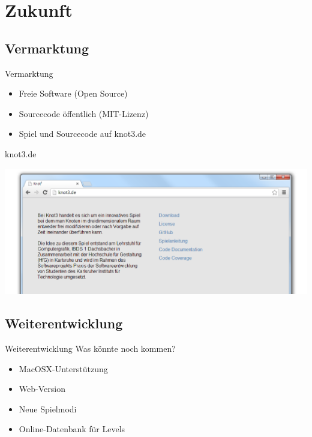 \documentclass[18pt]{beamer}
\begin{document}




\section{Zukunft}
\subsection{Vermarktung}
\begin{frame}{Vermarktung}
\begin{itemize}
\item Freie Software (Open Source)
\item Sourcecode öffentlich (MIT-Lizenz)
\item Spiel und Sourcecode auf knot3.de

\end{itemize}

\end{frame}


\begin{frame}{knot3.de}
\begin{center}
\includegraphics[scale=0.44]{webseite}
\end{center}

\end{frame}

\subsection{Weiterentwicklung}
\begin{frame}{Weiterentwicklung}
Was könnte noch kommen?
\begin{itemize}
\item MacOSX-Unterstützung 
\item Web-Version
\item Neue Spielmodi
\item Online-Datenbank für Levels
\end{itemize}


\end{frame}
\end{document}
